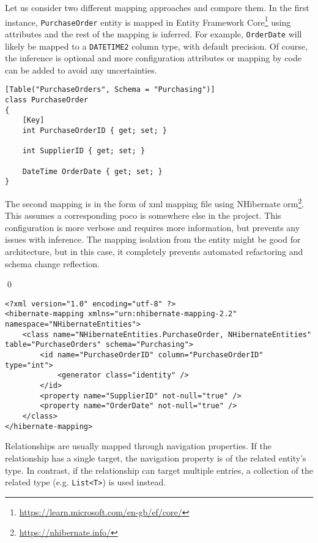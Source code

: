 \begin{example}
\small
Let us consider two different mapping approaches and compare them. In the first instance, \texttt{PurchaseOrder} entity is mapped in Entity Framework Core\footnote{\url{https://learn.microsoft.com/en-gb/ef/core/}} using attributes and the rest of the mapping is inferred. For example, \texttt{OrderDate} will likely be mapped to a \texttt{DATETIME2} column type, with default precision. Of course, the inference is optional and more configuration attributes or mapping by code can be added to avoid any uncertainties. 
\begin{lstlisting}[language=CSharp]
[Table("PurchaseOrders", Schema = "Purchasing")]
class PurchaseOrder
{
    [Key]
    int PurchaseOrderID { get; set; }

    int SupplierID { get; set; }

    DateTime OrderDate { get; set; }
}
\end{lstlisting}
The second mapping is in the form of \acrshort{xml} mapping file using NHibernate \acrshort{orm}\footnote{\url{https://nhibernate.info/}}. This assumes a corresponding \acrshort{poco} is somewhere else in the project. This configuration is more verbose and requires more information, but prevents any issues with inference. The mapping isolation from the entity might be good for architecture, but in this case, it completely prevents automated refactoring and schema change reflection.

\qed
\begin{lstlisting}[language=CSharp]
<?xml version="1.0" encoding="utf-8" ?>
<hibernate-mapping xmlns="urn:nhibernate-mapping-2.2" namespace="NHibernateEntities">
    <class name="NHibernateEntities.PurchaseOrder, NHibernateEntities" table="PurchaseOrders" schema="Purchasing">
        <id name="PurchaseOrderID" column="PurchaseOrderID" type="int">
            <generator class="identity" />
        </id>
        <property name="SupplierID" not-null="true" />
        <property name="OrderDate" not-null="true" />
    </class>
</hibernate-mapping>
\end{lstlisting}
\end{example}

Relationships are usually mapped through navigation properties. If the relationship has a single target, the navigation property is of the related entity's type. In contrast, if the relationship can target multiple entries, a collection of the related type (e.g. \texttt{List<T>}) is used instead.

